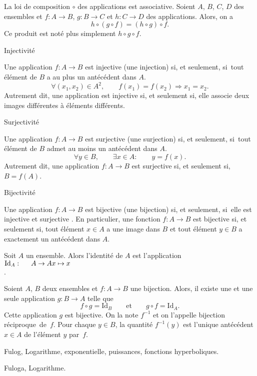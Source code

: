 \Propriete []  La loi de composition $\circ$ des applications est associative. Soient $A$, $B$, $C$, $D$ des ensembles et $f:A\to B$, $g:B\to C$ et $h:C\to D$ des applications. Alors, on a 
$$
h\circ(g\circ f)=(h\circ g)\circ f.
$$
Ce produit est not\'e plus simplement $h\circ g\circ f$. 
\bigskip

\Concept [] Injectivit\'e

\Definition []  Une application $f:A\to B$ est injective (une injection) si, et seulement, si~tout \'el\'ement de $B$ a au plus un ant\'ec\'edent dans $A$. 
$$
\forall (x_1,x_2)\in A^2, \qquad f(x_1)=f(x_2)\Longrightarrow x_1=x_2.
$$
Autrement dit, une application est injective si, et seulement si, elle associe deux images diff\'erentes \`a \'el\'ements diff\'erents. 

\Concept [] Surjectivit\'e

\Definition []  Une application $f:A\to B$ est surjective (une surjection) si, et seulement, si~tout \'el\'ement de $B$ admet au moins un ant\'ec\'edent dans $A$. 
$$
\forall y\in B, \qquad \exists x\in A:\qquad y=f(x).
$$
Autrement dit, une application $f:A\to B$ est surjective si, et seulement si, $B=f(A)$. 

\Concept [] Bijectivit\'e

\Definition []  Une application $f:A\to B$ est bijective (une bijection) si, et seulement, si~elle est injective et surjective .
\bigskip \noindent En particulier, une fonction $f:A\to B$ est bijective si, et seulement si, tout \'el\'ement $x\in A$ a une
image dans $B$ et tout \'el\'ement $y\in B$ a exactement un ant\'ec\'edent dans $A$.  \bigskip


\Definition []  Soit $A$ un ensemble. Alors l'identit\'e de $A$ est l'application $\mbox{Id}_A:\vtop{\mbox{$A\to A$}\mbox{$x\mapsto x$}}$.

\Propriete []  Soient $A$, $B$ deux ensembles et $f:A\to B$ une bijection. Alors, il existe une et une seule application $g:B\to
A$ telle que $$ {f\circ g=\mbox{Id}_B}\qquad\mbox{et}\qquad {g\circ f=\mbox{Id}_A}. $$ Cette application $g$ est bijective.
On la note $f^{-1}$ et on l'appelle bijection r\'eciproque~de~$f$.  \medskip\noindent Pour chaque $y\in B$, la
quantit\'e $f^{-1}(y)$ est l'unique ant\'ec\'edent $x\in A$ de l'\'el\'ement $y$ par~$f$. \bigskip

 

\Section Fulog, Logarithme, exponentielle, puissances, fonctions hyperboliques.

\Subsection Fuloga, Logarithme.

